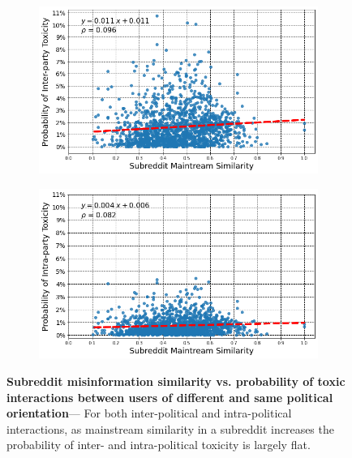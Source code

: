 \begin{figure}
\begin{subfigure}{.49\textwidth}
  \centering
\includegraphics[width=1\linewidth]{figures/subreddit_mainstream_toxicity_interparty.png}
\label{fig:misinformation-interparty}
\end{subfigure}%
\begin{subfigure}{.49\textwidth}
  \centering
\includegraphics[width=1\linewidth]{figures/mainstream_intra_party_toxic.png}
  \label{fig:misinformation-intrapary}
\end{subfigure}

\caption{\textbf{Subreddit misinformation similarity vs. probability of toxic interactions between users of different and same political orientation}--- For both inter-political and intra-political interactions, as mainstream similarity in a subreddit increases the probability of inter- and intra-political toxicity is largely flat.}
\label{fig:subreddit-mainstram-rate-toxictiy-rate}
\end{figure}

